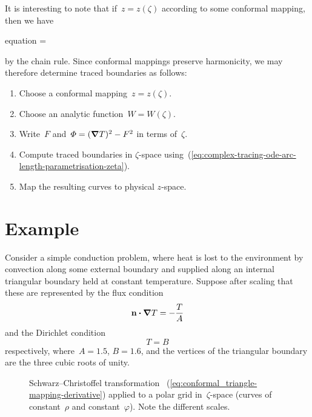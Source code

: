 It is interesting to note that
if~$z = z (\zeta)$ according to some conformal mapping,
then we have
\begin{important}{equation}
   = 
  \label{eq:complex-tracing-ode-arc-length-parametrisation-zeta}
\end{important}
by the chain rule.
Since conformal mappings preserve harmonicity,
we may therefore determine traced boundaries as follows:
\begin{enumerate}
  \tightlist
  \item
    Choose a conformal mapping~$z = z (\zeta)$.
  \item
    Choose an analytic function~$W = W (\zeta)$.
  \item
    Write~$F$ and~$\varPhi = (\mathop{}\!\boldsymbol{\mathbf{\nabla}} T)^2 - F^2$ in terms of~$\zeta$.
  \item
    Compute traced boundaries in $\zeta$-space
    using~(\ref{eq:complex-tracing-ode-arc-length-parametrisation-zeta}).
  \item
    Map the resulting curves to physical $z$-space.
\end{enumerate}

\section{Example}
\label{sec:complex.example}

Consider a simple conduction problem,
where heat is lost to the environment
by convection along some external boundary
and supplied along an internal triangular boundary
held at constant temperature.
Suppose after scaling that these are represented
by the flux condition
\begin{equation}
  \mathop{}\!\boldsymbol{\mathbf{n}} \boldsymbol{\cdot} \mathop{}\!\boldsymbol{\mathbf{\nabla}} T = -\frac{T}{A}
  \label{eq:example-flux-boundary-condition}
\end{equation}
and the Dirichlet condition
\begin{equation}
  T = B
  \label{eq:example-dirichlet-condition}
\end{equation}
respectively,
where~$A = 1.5$, $B = 1.6$,
and the vertices of the triangular boundary
are the three cubic roots of unity.

\begin{figure}
  \newcommand*{\subfigurewidth}{0.47\textwidth}
  \begin{subfigure}[t]{\subfigurewidth}
  \end{subfigure}
    \hfill
  \begin{subfigure}[t]{\subfigurewidth}
  \end{subfigure}
  \caption{
    Schwarz--Christoffel transformation~%
      (\ref{eq:conformal_triangle-mapping-derivative})
    applied to a polar grid in~$\zeta$-space
    (curves of constant~$\rho$ and constant~$\varphi$).
    Note the different scales.
  }
  \label{fig:conformal_triangle-grid}
\end{figure}

